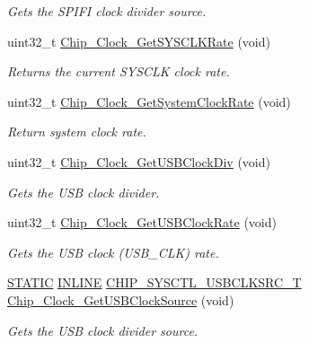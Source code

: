\begin{DoxyCompactItemize}
\begin{DoxyCompactList}\small\item\em Gets the S\+P\+I\+FI clock divider source. \end{DoxyCompactList}\item 
uint32\+\_\+t \hyperlink{group__CLOCK__17XX__40XX_gaec133465745ce56e49b184185f8252e1}{Chip\+\_\+\+Clock\+\_\+\+Get\+S\+Y\+S\+C\+L\+K\+Rate} (void)
\begin{DoxyCompactList}\small\item\em Returns the current S\+Y\+S\+C\+LK clock rate. \end{DoxyCompactList}\item 
uint32\+\_\+t \hyperlink{group__CLOCK__17XX__40XX_gaf3dd97239f9db511dbc71c531132cc08}{Chip\+\_\+\+Clock\+\_\+\+Get\+System\+Clock\+Rate} (void)
\begin{DoxyCompactList}\small\item\em Return system clock rate. \end{DoxyCompactList}\item 
uint32\+\_\+t \hyperlink{group__CLOCK__17XX__40XX_ga5852bdb5470a03988aaae8c68e3fb5fd}{Chip\+\_\+\+Clock\+\_\+\+Get\+U\+S\+B\+Clock\+Div} (void)
\begin{DoxyCompactList}\small\item\em Gets the U\+SB clock divider. \end{DoxyCompactList}\item 
uint32\+\_\+t \hyperlink{group__CLOCK__17XX__40XX_gac8679aba3cc005f859604a09ceceb4a4}{Chip\+\_\+\+Clock\+\_\+\+Get\+U\+S\+B\+Clock\+Rate} (void)
\begin{DoxyCompactList}\small\item\em Gets the U\+SB clock (U\+S\+B\+\_\+\+C\+LK) rate. \end{DoxyCompactList}\item 
\hyperlink{group__LPC__Types__Public__Macros_ga10b2d890d871e1489bb02b7e70d9bdfb}{S\+T\+A\+T\+IC} \hyperlink{group__LPC__Types__Public__Types_ga2eb6f9e0395b47b8d5e3eeae4fe0c116}{I\+N\+L\+I\+NE} \hyperlink{group__CLOCK__17XX__40XX_ga0ba14bd48363645f607b49fbcc8624df}{C\+H\+I\+P\+\_\+\+S\+Y\+S\+C\+T\+L\+\_\+\+U\+S\+B\+C\+L\+K\+S\+R\+C\+\_\+T} \hyperlink{group__CLOCK__17XX__40XX_ga2e7aa1ac705f25b3b1d41cec33a3893b}{Chip\+\_\+\+Clock\+\_\+\+Get\+U\+S\+B\+Clock\+Source} (void)
\begin{DoxyCompactList}\small\item\em Gets the U\+SB clock divider source. \end{DoxyCompactList}\item 

\end{DoxyCompactItemize}
